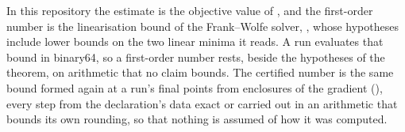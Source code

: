 
In this repository the estimate is the objective value of
, and the first-order number is the linearisation
bound of the Frank--Wolfe solver, ,
whose hypotheses include lower bounds on the two linear minima it reads. A
run evaluates that bound in binary64, so a first-order number rests, beside
the hypotheses of the theorem, on arithmetic that no claim bounds. The
certified number is the same bound formed again at a run's final points from
enclosures of the gradient
(), every step from the
declaration's data exact or carried out in an arithmetic that bounds its own
rounding, so that nothing is assumed of how it was computed.

